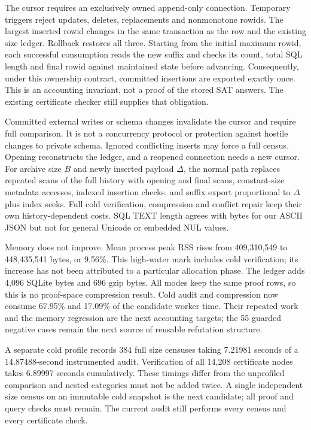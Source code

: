 \documentclass[11pt,a4paper]{article}
\numberwithin{equation}{section}
\theoremstyle{plain}
\theoremstyle{definition}
\theoremstyle{remark}
\begin{document}
The cursor requires an exclusively owned append-only connection. Temporary
triggers reject updates, deletes, replacements and nonmonotone rowids. The
largest inserted rowid changes in the same transaction as the row and the
existing size ledger. Rollback restores all three. Starting from the initial
maximum rowid, each successful consumption reads the new suffix and checks its
count, total SQL length and final rowid against maintained state before advancing.
Consequently, under this ownership contract, committed insertions are exported
exactly once. This is an accounting invariant, not a proof of the stored SAT
answers. The existing certificate checker still supplies that obligation.

Committed external writes or schema changes invalidate the cursor and require
full comparison. It is not a concurrency protocol or protection against hostile
changes to private schema. Ignored conflicting inserts may force a full census.
Opening reconstructs the ledger, and a reopened connection needs a new cursor.
For archive size $B$ and newly inserted payload $\Delta$, the normal path replaces
repeated scans of the full history with opening and final scans, constant-size
metadata accesses, indexed insertion checks, and suffix export proportional to
$\Delta$ plus index seeks. Full cold verification, compression and conflict
repair keep their own history-dependent costs. SQL TEXT length agrees with
bytes for our ASCII JSON but not for general Unicode or embedded NUL values.

Memory does not improve. Mean process peak RSS rises from 409,310,549 to
448,435,541 bytes, or 9.56\%. This high-water mark includes cold verification;
its increase has not been attributed to a particular allocation phase. The
ledger adds 4,096 SQLite bytes and 696 gzip bytes. All modes keep the same proof
rows, so this is no proof-space compression result. Cold audit and compression
now consume 67.95\% and 17.09\% of the candidate worker time. Their repeated
work and the memory regression are the next accounting targets; the 55 guarded
negative cases remain the next source of reusable refutation structure.

A separate cold profile records 384 full size censuses taking 7.21981 seconds
of a 14.87488-second instrumented audit. Verification of all 14,208 certificate
nodes takes 6.89997 seconds cumulatively. These timings differ from the
unprofiled comparison and nested categories must not be added twice. A single
independent size census on an immutable cold snapshot is the next candidate;
all proof and query checks must remain. The current audit still performs every
census and every certificate check.
\end{document}
